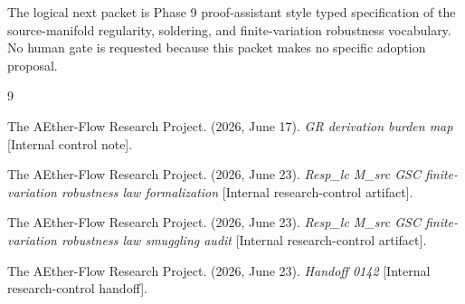 \documentclass[11pt]{article}
\begin{document}
The logical next packet is Phase 9 proof-assistant style typed specification
of the source-manifold regularity, soldering, and finite-variation robustness
vocabulary. No human gate is requested because this packet makes no specific
adoption proposal.

\begin{thebibliography}{9}

The AEther-Flow Research Project. (2026, June 17). \emph{GR derivation
burden map} [Internal control note].

The AEther-Flow Research Project. (2026, June 23). \emph{Resp\_lc M\_src
GSC finite-variation robustness law formalization}
[Internal research-control artifact].

The AEther-Flow Research Project. (2026, June 23). \emph{Resp\_lc M\_src
GSC finite-variation robustness law smuggling audit}
[Internal research-control artifact].

The AEther-Flow Research Project. (2026, June 23). \emph{Handoff 0142}
[Internal research-control handoff].

\end{thebibliography}
\end{document}
